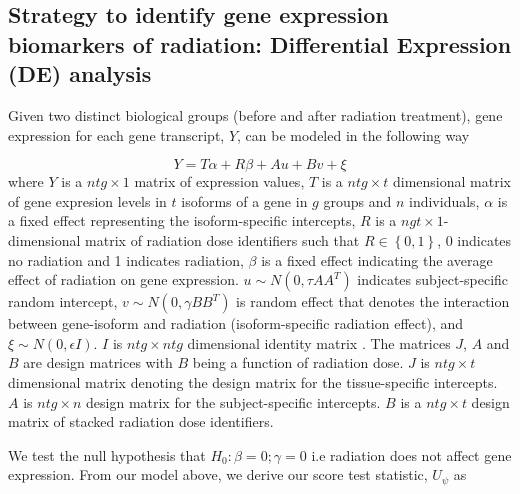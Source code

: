 \documentclass[hidelinks,11pt]{article}
\begin{document}
\subsection*{Strategy to identify gene expression biomarkers of radiation: Differential Expression (DE) analysis}

Given two distinct biological groups (before and after radiation treatment), gene expression for each gene transcript, $Y$, can be modeled in the following way

\begin{equation}
Y = T \alpha + R\beta + Au + Bv + \xi
\end{equation}
where $Y$ is a $ntg \times 1$ matrix of expression values, $T$ is a $ntg \times t$ dimensional matrix of gene expresion levels in $t$ isoforms of a gene in $g$ groups and $n$ individuals, $\alpha$ is a fixed effect representing the isoform-specific intercepts, $R$ is a $ngt \times 1$-dimensional matrix of radiation dose identifiers such that $R\in\left\{0,1\right\}$, 0 indicates no radiation and 1 indicates radiation, $\beta$ is a fixed effect indicating the average effect of radiation on gene expression. $u \sim N\left(0, \tau AA^T \right)$ indicates subject-specific random intercept, $v \sim N\left(0,\gamma BB^T \right)$ is random effect that denotes the interaction between gene-isoform and radiation (isoform-specific radiation effect), and $\xi \sim N\left(0, \epsilon I \right)$. $I$ is $ntg \times ntg$ dimensional identity matrix . The matrices $J$, $A$ and $B$ are design matrices with $B$ being a function of radiation dose. $J$ is $ntg \times t$ dimensional matrix denoting the design matrix for the tissue-specific intercepts. $A$ is $ntg \times n$ design matrix for the subject-specific intercepts. $B$ is a $ntg \times t$ design matrix of stacked radiation dose identifiers.

We test the null hypothesis that  $H_0: \beta = 0; \gamma=0$ i.e radiation does not affect gene expression. From our model above, we derive our score test statistic, $U_\psi$ as
\end{document}
